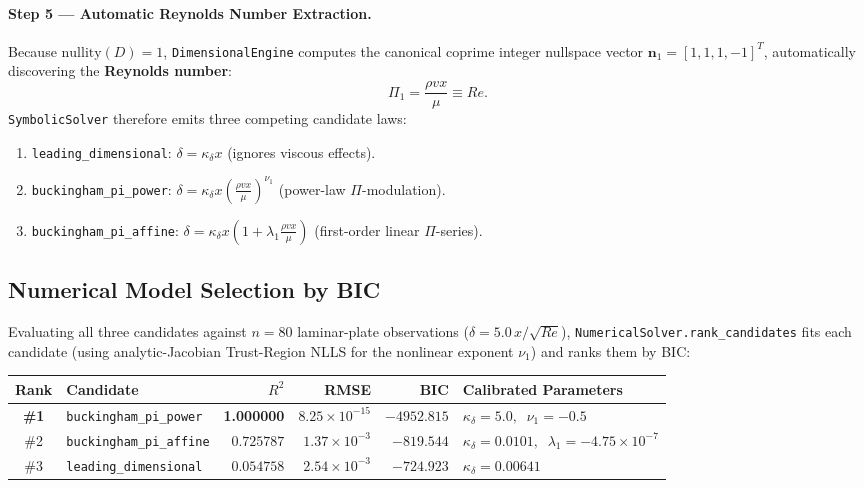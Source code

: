 \documentclass[11pt,a4paper]{article}
\begin{document}
\paragraph{Step 5 — Automatic Reynolds Number Extraction.}
Because $\text{nullity}(D) = 1$, \texttt{DimensionalEngine} computes the canonical coprime integer nullspace vector $\mathbf{n}_1 = [1, 1, 1, -1]^T$, automatically discovering the \textbf{Reynolds number}:
\begin{equation}
  \Pi_1 = \frac{\rho v x}{\mu} \equiv Re.
\end{equation}
\texttt{SymbolicSolver} therefore emits three competing candidate laws:
\begin{enumerate}[leftmargin=1.5em,itemsep=2pt]
  \item \texttt{leading\_dimensional}: $\delta = \kappa_\delta x$ \quad (ignores viscous effects).
  \item \texttt{buckingham\_pi\_power}: $\delta = \kappa_\delta x \left(\frac{\rho v x}{\mu}\right)^{\nu_1}$ \quad (power-law $\Pi$-modulation).
  \item \texttt{buckingham\_pi\_affine}: $\delta = \kappa_\delta x \left(1 + \lambda_1 \frac{\rho v x}{\mu}\right)$ \quad (first-order linear $\Pi$-series).
\end{enumerate}

\subsection*{Numerical Model Selection by BIC}
Evaluating all three candidates against $n = 80$ laminar-plate observations ($\delta = 5.0\,x/\sqrt{Re}$), \texttt{NumericalSolver.rank\_candidates} fits each candidate (using analytic-Jacobian Trust-Region NLLS for the nonlinear exponent $\nu_1$) and ranks them by BIC:

\begin{center}
\renewcommand{\arraystretch}{1.25}
\begin{tabular}{@{}clrrrl@{}}
\toprule
\textbf{Rank} & \textbf{Candidate} & \textbf{$R^2$} & \textbf{RMSE} & \textbf{BIC} & \textbf{Calibrated Parameters} \\
\midrule
\textbf{\#1} & \texttt{buckingham\_pi\_power} & \textbf{1.000000} & \textbf{$8.25\times 10^{-15}$} & \textbf{$-4952.815$} & $\kappa_\delta = 5.0,\;\; \nu_1 = -0.5$ \\
\#2 & \texttt{buckingham\_pi\_affine} & $0.725787$ & $1.37\times 10^{-3}$ & $-819.544$ & $\kappa_\delta = 0.0101,\;\; \lambda_1 = -4.75\times 10^{-7}$ \\
\#3 & \texttt{leading\_dimensional} & $0.054758$ & $2.54\times 10^{-3}$ & $-724.923$ & $\kappa_\delta = 0.00641$ \\
\bottomrule
\end{tabular}
\end{center}
\end{document}
